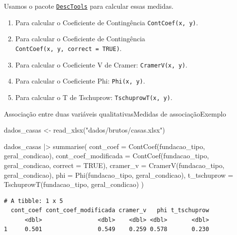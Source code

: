 \documentclass[
  10pt,
  ignorenonframetext,
]{beamer}
\newenvironment{Shaded}{\begin{snugshade}}{\end{snugshade}}
\newcommand{\AttributeTok}[1]{\textcolor[rgb]{0.40,0.45,0.13}{#1}}
\newcommand{\ConstantTok}[1]{\textcolor[rgb]{0.56,0.35,0.01}{#1}}
\newcommand{\FunctionTok}[1]{\textcolor[rgb]{0.28,0.35,0.67}{#1}}
\newcommand{\NormalTok}[1]{\textcolor[rgb]{0.00,0.23,0.31}{#1}}
\newcommand{\OtherTok}[1]{\textcolor[rgb]{0.00,0.23,0.31}{#1}}
\newcommand{\SpecialCharTok}[1]{\textcolor[rgb]{0.37,0.37,0.37}{#1}}
\newcommand{\StringTok}[1]{\textcolor[rgb]{0.13,0.47,0.30}{#1}}
\providecommand{\tightlist}{%
  \setlength{\itemsep}{0pt}\setlength{\parskip}{0pt}}\usepackage{longtable,booktabs,array}
\begin{document}
\begin{frame}[fragile]
Usamos o pacote
\href{http://andrisignorell.github.io/DescTools/}{\texttt{DescTools}}
para calcular essas medidas.

\begin{enumerate}
\tightlist
\item
  Para calcular o Coeficiente de Contingência \texttt{ContCoef(x,\ y)}.
\item
  Para calcular o Coeficiente de Contingência
  \texttt{ContCoef(x,\ y,\ correct\ =\ TRUE)}.
\item
  Para calcular o Coeficiente V de Cramer: \texttt{CramerV(x,\ y)}.
\item
  Para calcular o Coeficiente Phi: \texttt{Phi(x,\ y)}.
\item
  Para calcular o T de Tschuprow: \texttt{TschuprowT(x,\ y)}.
\end{enumerate}
\end{frame}

\begin{frame}[fragile]{Associação entre duas variáveis
qualitativas\newline Medidas de associação\newline Exemplo}
\protect\hypertarget{associauxe7uxe3o-entre-duas-variuxe1veis-qualitativasmedidas-de-associauxe7uxe3oexemplo}{}
\begin{Shaded}
\begin{Highlighting}[]
\NormalTok{dados\_casas }\OtherTok{\textless{}{-}} \FunctionTok{read\_xlsx}\NormalTok{(}\StringTok{"dados/brutos/casas.xlsx"}\NormalTok{)}

\NormalTok{dados\_casas }\SpecialCharTok{|\textgreater{}} 
  \FunctionTok{summarise}\NormalTok{(}
    \AttributeTok{cont\_coef =} \FunctionTok{ContCoef}\NormalTok{(fundacao\_tipo, geral\_condicao),}
    \AttributeTok{cont\_coef\_modificada =} \FunctionTok{ContCoef}\NormalTok{(fundacao\_tipo, geral\_condicao, }\AttributeTok{correct =} \ConstantTok{TRUE}\NormalTok{),}
    \AttributeTok{cramer\_v =} \FunctionTok{CramerV}\NormalTok{(fundacao\_tipo, geral\_condicao),}
    \AttributeTok{phi =} \FunctionTok{Phi}\NormalTok{(fundacao\_tipo, geral\_condicao),}
    \AttributeTok{t\_tschuprow =} \FunctionTok{TschuprowT}\NormalTok{(fundacao\_tipo, geral\_condicao)}
\NormalTok{  )}
\end{Highlighting}
\end{Shaded}

\begin{verbatim}
# A tibble: 1 x 5
  cont_coef cont_coef_modificada cramer_v   phi t_tschuprow
      <dbl>                <dbl>    <dbl> <dbl>       <dbl>
1     0.501                0.549    0.259 0.578       0.230
\end{verbatim}
\end{frame}
\end{document}
